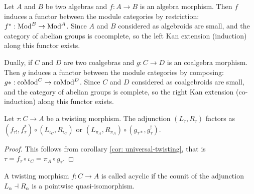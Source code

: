 \documentclass[../thesis.tex]{subfiles}
\begin{document}
            Let $A$ and $B$ be two algebras and $f : A \rightarrow B$ is an algebra morphism. Then $f$ induces a functor between the module categories by restriction: $f^* : \tt{Mod}^B \rightarrow \tt{Mod}^A$. Since $A$ and $B$ considered as algebroids are small, and the category of abelian groups is cocomplete, so the left Kan extension (induction) along this functor exists.
            \begin{center}
            \end{center}

            Dually, if $C$ and $D$ are two coalgebras and $g : C \rightarrow D$ is an coalgebra morphism. Then $g$ induces a functor between the module categories by composing: $g* : \tt{coMod}^C \rightarrow \tt{coMod}^D$. Since $C$ and $D$ considered as coalgebroids are small, and the category of abelian groups is complete, so the right Kan extension (co-induction) along this functor exists.
            \begin{center}
            \end{center}

            \begin{lemma}\label{lem: twist-fac}
                Let $\tau : C \rightarrow A$ be a twisting morphism. The adjunction $(L_\tau, R_\tau)$ factors as $(f_{\tau !}, f_\tau^*)\circ (L_{\iota_C},R_{\iota_C})$ or $(L_{\pi_A},R_{\pi_A})\circ (g_{\tau *}, g_\tau^!)$.
            \end{lemma}

            \begin{proof}
                This follows from corollary \ref{cor: universal-twisting}, that is $\tau = f_\tau \circ \iota_C = \pi_A\circ g_\tau$.
            \end{proof}

            \begin{definition}
                A twisting morphism $f: C \rightarrow A$ is called acyclic if the counit of the adjunction $L_\alpha \dashv R_\alpha$ is a pointwise quasi-isomorphism.
            \end{definition}
\end{document}
